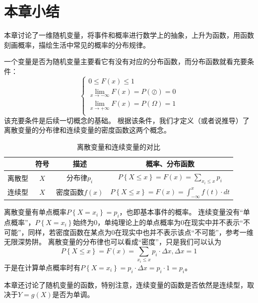 \section{本章小结}

本章讨论了一维随机变量，将事件和概率进行数学上的抽象，上升为函数，用函数刻画概率，描绘生活中常见的概率的分布规律。

一个变量是否为随机变量主要看它有没有对应的分布函数，而分布函数就看充要条件：
\[
\begin{cases}
	0\leqslant F\left( x \right) \leqslant 1\\
	\underset{x\rightarrow -\infty}{\lim}F\left( x \right) =P\left( \oslash \right) =0\\
	\underset{x\rightarrow +\infty}{\lim}F\left( x \right) =P\left( \varOmega \right) =1\\
\end{cases}
\]
该充要条件是后续一切概念的基础。
根据该条件，我们才定义（或者说推导）了离散变量的分布律和连续变量的密度函数这两个概念。

\begin{table}[h]
\centering
\caption{离散变量和连续变量的对比}
\begin{tabular}{cccc}
    \toprule
     & 符号 & 描述 & 概率、分布函数\\
    \midrule
    离散型 & $X$ & 分布律$p_i$ & $P\left\{ X\leqslant x \right\} =F\left( x \right) =\sum_{x_i\leqslant x}{p_i}$\\
    连续型 & $X$ & 密度函数$f\left( x \right) $ & $P\left\{ X\leqslant x \right\} =F\left( x \right) =\int_{-\infty}^x{f\left( t \right) \cdot dt}$\\
    \bottomrule
\end{tabular}
\end{table}

离散变量有单点概率$P\left\{ X=x_i \right\} =p_i$，也即基本事件的概率。
连续变量没有“单点概率”，$P\left\{ X=x_i \right\} $始终为0，单纯理论上的单点概率为0在现实中并不表示“不可能”，同样，若密度函数在某点为0在现实中也并不表示该点“不可能”，参考一维无限深势阱。
离散变量的分布律也可以看成“密度”，只是我们可以认为
\[
P\left\{ X\leqslant x \right\} =F\left( x \right) =\sum_{x_i\leqslant x}{p_i\cdot \Delta x},   \Delta x=1
\]
于是在计算单点概率时有$P\left\{ X=x_i \right\} =p_i\cdot \Delta x=p_i\cdot 1=p_i$。

本章还讨论了随机变量的函数，特别注意，连续变量的函数是否依然是连续型，取决于$Y=g\left( X \right) $是否为单调。




